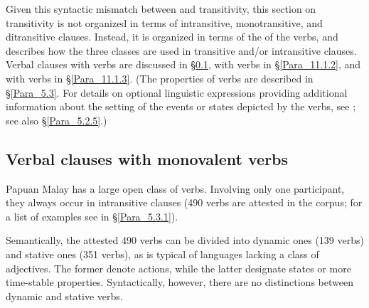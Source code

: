 Given this syntactic mismatch between  and transitivity, this section on transitivity is not organized in terms of intransitive, monotransitive, and ditransitive clauses. Instead, it is organized in terms of the  of the verbs, and describes how the three  classes are used in transitive and/or intransitive clauses. Verbal clauses with  verbs are discussed in §\ref{Para_11.1.1}, with  verbs in §\ref{Para_11.1.2}, and with  verbs in §\ref{Para_11.1.3}. (The properties of verbs are described in §\ref{Para_5.3}. For details on optional linguistic expressions providing additional information about the setting of the events or states depicted by the verbs, see ; see also §\ref{Para_5.2.5}.)


\subsection{Verbal clauses with {monovalent} verbs}
\label{Para_11.1.1}
Papuan Malay has a large open class of  verbs. Involving only one participant, they always occur in intransitive clauses (490  verbs are attested in the corpus; for a list of examples see  in §\ref{Para_5.3.1}).



Semantically, the attested 490 verbs can be divided into dynamic ones (139 verbs) and stative ones (351 verbs), as is typical of languages lacking a class of adjectives. The former denote actions, while the latter designate states or more time-stable properties. Syntactically, however, there are no distinctions between dynamic and stative verbs.



